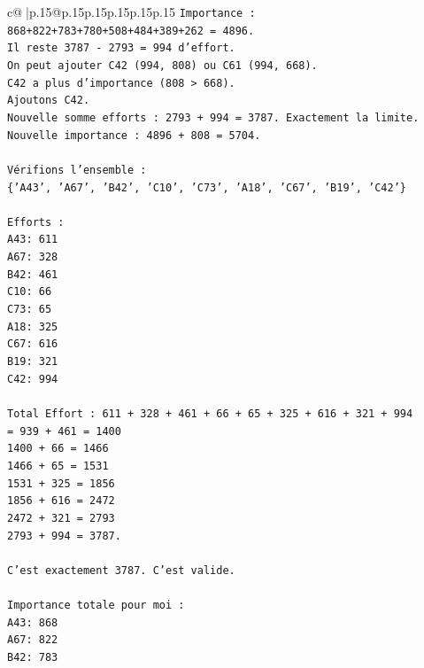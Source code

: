 \documentclass{article}
\begin{document}
{\begin{supertabular}{c@{$\;$}|p{.15\linewidth}@{}p{.15\linewidth}p{.15\linewidth}p{.15\linewidth}p{.15\linewidth}p{.15\linewidth}}
{{{\texttt{Importance : 868+822+783+780+508+484+389+262 = 4896.} \\
\texttt{Il reste 3787 {-} 2793 = 994 d'effort.} \\
\texttt{On peut ajouter C42 (994, 808) ou C61 (994, 668).} \\
\texttt{C42 a plus d'importance (808 > 668).} \\
\texttt{Ajoutons C42.} \\
\texttt{Nouvelle somme efforts : 2793 + 994 = 3787. Exactement la limite.} \\
\texttt{Nouvelle importance : 4896 + 808 = 5704.} \\
\\ 
\texttt{Vérifions l'ensemble :} \\
\texttt{\{'A43', 'A67', 'B42', 'C10', 'C73', 'A18', 'C67', 'B19', 'C42'\}} \\
\\ 
\texttt{Efforts :} \\
\texttt{A43: 611} \\
\texttt{A67: 328} \\
\texttt{B42: 461} \\
\texttt{C10: 66} \\
\texttt{C73: 65} \\
\texttt{A18: 325} \\
\texttt{C67: 616} \\
\texttt{B19: 321} \\
\texttt{C42: 994} \\
\\ 
\texttt{Total Effort : 611 + 328 + 461 + 66 + 65 + 325 + 616 + 321 + 994} \\
\texttt{= 939 + 461 = 1400} \\
\texttt{1400 + 66 = 1466} \\
\texttt{1466 + 65 = 1531} \\
\texttt{1531 + 325 = 1856} \\
\texttt{1856 + 616 = 2472} \\
\texttt{2472 + 321 = 2793} \\
\texttt{2793 + 994 = 3787.} \\
\\ 
\texttt{C'est exactement 3787. C'est valide.} \\
\\ 
\texttt{Importance totale pour moi :} \\
\texttt{A43: 868} \\
\texttt{A67: 822} \\
\texttt{B42: 783} \\
}}}
\end{supertabular}}
\end{document}
